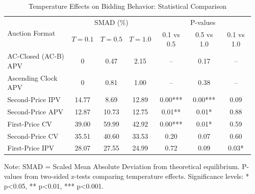 \begin{table}[htbp]
\centering
\caption{Temperature Effects on Bidding Behavior: Statistical Comparison}
\label{tab:temperature_comparison}
\begin{tabular}{l|ccc|ccc}
\hline
\multirow{2}{*}{Auction Format} & \multicolumn{3}{c|}{SMAD (\%)} & \multicolumn{3}{c}{P-values} \\
 & $T=0.1$ & $T=0.5$ & $T=1.0$ & 0.1 vs 0.5 & 0.5 vs 1.0 & 0.1 vs 1.0 \\
\hline
AC-Closed (AC-B) APV & 0 & 0.47 & 2.15 & -- & 0.17 & -- \\
Ascending Clock APV & 0 & 0.81 & 1.00 & -- & 0.38 & -- \\
Second-Price IPV & 14.77 & 8.69 & 12.89 & 0.00*** & 0.00*** & 0.09 \\
Second-Price APV & 12.87 & 10.73 & 12.75 & 0.01** & 0.01* & 0.88 \\
First-Price CV & 39.00 & 59.99 & 42.92 & 0.00*** & 0.01* & 0.59 \\
Second-Price CV & 35.51 & 40.60 & 33.53 & 0.20 & 0.07 & 0.60 \\
First-Price IPV & 28.07 & 27.55 & 24.99 & 0.72 & 0.09 & 0.03* \\
\hline
\end{tabular}
\begin{tablenotes}
\small
\item Note: SMAD = Scaled Mean Absolute Deviation from theoretical equilibrium. 
P-values from two-sided z-tests comparing temperature effects. 
Significance levels: * p<0.05, ** p<0.01, *** p<0.001.
\end{tablenotes}
\end{table}